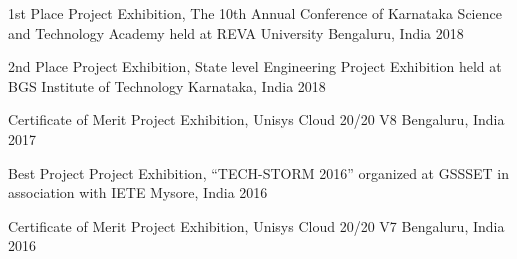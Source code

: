 \begin{cvhonors}

  \cvhonor
    {1st Place} %
    {Project Exhibition, The 10th Annual Conference of Karnataka Science and Technology Academy  held at REVA University} %
    {Bengaluru, India} %
    {2018} %

  \cvhonor
    {2nd Place} %
    {Project Exhibition, State level Engineering Project Exhibition held at BGS Institute of Technology} %
    {Karnataka, India} %
    {2018} %


\cvhonor
    {Certificate of Merit} %
    {Project Exhibition, Unisys Cloud 20/20 V8} %
    {Bengaluru, India} %
    {2017} %


\cvhonor
    {Best Project} %
    {Project Exhibition, “TECH-STORM 2016” organized at GSSSET in association with IETE} %
    {Mysore, India} %
    {2016} %


\cvhonor
    {Certificate of Merit} %
    {Project Exhibition, Unisys Cloud 20/20 V7} %
    {Bengaluru, India} %
    {2016} %

\end{cvhonors}


